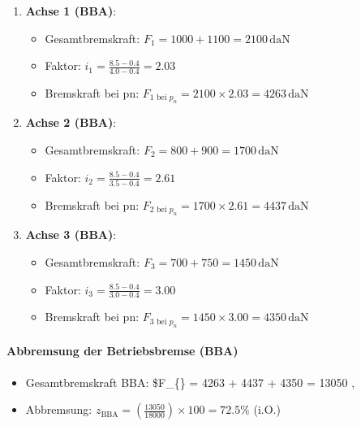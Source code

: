 \documentclass{vorlage-design-main}
\begin{document}
\begin{enumerate}
\def\labelenumi{\arabic{enumi}.}

\item
  \textbf{Achse 1 (BBA)}:

  \begin{itemize}

  \item
    Gesamtbremskraft: $F_1 = 1000 + 1100 = 2100 \, \text{daN}$
  \item
    Faktor: $i_1 = \frac{8.5 - 0.4}{4.0 - 0.4} = 2.03$
  \item
    Bremskraft bei pn:
    $F_{1 \text{ bei } p_n} = 2100 \times 2.03 = 4263 \, \text{daN}$
  \end{itemize}
\item
  \textbf{Achse 2 (BBA)}:

  \begin{itemize}

  \item
    Gesamtbremskraft: $F_2 = 800 + 900 = 1700 \, \text{daN}$
  \item
    Faktor: $i_2 = \frac{8.5 - 0.4}{3.5 - 0.4} = 2.61$
  \item
    Bremskraft bei pn:
    $F_{2 \text{ bei } p_n} = 1700 \times 2.61 = 4437 \, \text{daN}$
  \end{itemize}
\item
  \textbf{Achse 3 (BBA)}:

  \begin{itemize}

  \item
    Gesamtbremskraft: $F_3 = 700 + 750 = 1450 \, \text{daN}$
  \item
    Faktor: $i_3 = \frac{8.5 - 0.4}{3.0 - 0.4} = 3.00$
  \item
    Bremskraft bei pn:
    $F_{3 \text{ bei } p_n} = 1450 \times 3.00 = 4350 \, \text{daN}$
  \end{itemize}
\end{enumerate}

\paragraph{Abbremsung der Betriebsbremse
(BBA)}\label{abbremsung-der-betriebsbremse-bba}

\begin{itemize}
\item
  Gesamtbremskraft BBA: \$F\_\{\} = 4263 + 4437 + 4350 = 13050
  , 
\item
  Abbremsung:
  $z_{\text{BBA}} = \left( \frac{13050}{18000} \right) \times 100 = 72.5\%$
  (i.O.)
\end{itemize}
\end{document}
